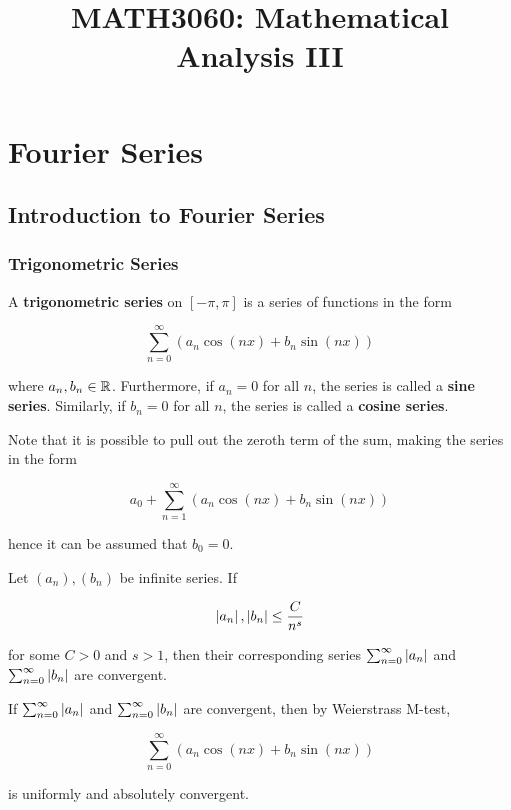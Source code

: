 \documentclass[a4paper,12pt]{article}
\begin{document}
\title{MATH3060: Mathematical Analysis III}


\remark{}



\section{Fourier Series}
\subsection{Introduction to Fourier Series}
\subsubsection{Trigonometric Series}
\begin{dft}
  A \textbf{trigonometric series} on $[-\pi,\pi]$ is a series of functions in the form

  $$\sum_{n=0}^{\infty}(a_{n}\cos(nx)+b_{n}\sin(nx))$$\s

  where $a_{n},b_{n}\in\mathbb{R}$. Furthermore, if $a_{n}=0$ for all $n$, the series is called a \textbf{sine series}. Similarly, if $b_{n}=0$ for all $n$, the series is called a \textbf{cosine series}.
\end{dft}\n

Note that it is possible to pull out the zeroth term of the sum, making the series in the form

$$a_{0}+\sum_{n=1}^{\infty}(a_{n}\cos(nx)+b_{n}\sin(nx))$$\s

hence it can be assumed that $b_{0}=0$.\n

\begin{pst}
  Let $(a_{n}),(b_{n})$ be infinite series. If
  
  $$\left| a_{n}\right|,\left| b_{n}\right|\leq\frac{C}{n^{s}}$$\s
  
  for some $C>0$ and $s>1$, then their corresponding series $\sum_{n=0}^{\infty}\left| a_{n}\right|$ and $\sum_{n=0}^{\infty}\left| b_{n}\right|$ are convergent.
\end{pst}

\begin{pst}
  If $\sum_{n=0}^{\infty}\left| a_{n}\right|$ and $\sum_{n=0}^{\infty}\left| b_{n}\right|$ are convergent, then by Weierstrass M-test,
  
  $$\sum_{n=0}^{\infty}(a_{n}\cos(nx)+b_{n}\sin(nx))$$\s
  
  is uniformly and absolutely convergent.
\end{pst}
\end{document}
